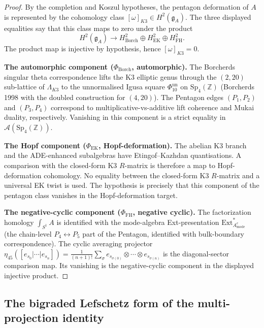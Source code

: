 \begin{proof}
By the completion and Koszul hypotheses, the pentagon deformation of
\(A\) is represented by the cohomology class
\([\omega]_{K3}\in H^2(\mathfrak g_A)\). The three displayed
equalities say that this class maps to zero under the product
\[
 H^2(\mathfrak g_A)\longrightarrow
 H^2_{\mathrm{Borch}}\oplus H^2_{\mathrm{EK}}\oplus H^2_{\mathrm{FH}} .
\]
The product map is injective by hypothesis, hence
\([\omega]_{K3}=0\).

\textbf{The automorphic component
 \textup{(}$\Phi_{\mathrm{Borch}}$, automorphic\textup{).}}
The Borcherds singular theta correspondence lifts the K$3$ elliptic
genus through the $(2, 20)$ sub-lattice of $\Lambda_{K3}$ to the unnormalised
Igusa square \(\Phi_{10}^{\mathrm{un}}\) on $\mathrm{Sp}_4(\mathbb{Z})$
\textup{(}Borcherds 1998 with the doubled construction for
$(4, 20)$\textup{).} The Pentagon edges $(P_1, P_2)$ and $(P_3, P_4)$
correspond to multiplicative-vs-additive lift coherence and Mukai
duality, respectively. Vanishing in this component is a strict equality in
$\mathcal{A}(\mathrm{Sp}_4(\mathbb{Z}))$.

\textbf{The Hopf component
 \textup{(}$\Phi_{\mathrm{EK}}$, Hopf-deformation\textup{).}}
The abelian K$3$ branch and the ADE-enhanced subalgebras have
Etingof--Kazhdan quantisations. A comparison with the closed-form
K$3$ \(R\)-matrix is therefore a map to Hopf-deformation cohomology.
No equality between the closed-form K$3$ \(R\)-matrix and a universal
EK twist is used. The hypothesis is precisely that this component of
the pentagon class vanishes in the Hopf-deformation target.

\textbf{The negative-cyclic component
 \textup{(}$\Phi_{\mathrm{FH}}$, negative cyclic\textup{).}}
The factorization homology $\int_{S^1} A$ is identified with the
mode-algebra Ext-presentation $\mathrm{Ext}^*_{A^e_{\mathrm{mode}}}$
\textup{(}the chain-level \(P_4 \leftrightarrow P_5\) part of the
Pentagon, identified with bulk-boundary correspondence\textup{).} The cyclic
averaging projector
$\eta_{45}([e_{s_0}|\cdots|e_{s_n}]) = \frac{1}{(n+1)!}\sum_{\sigma}
e_{s_{\sigma(0)}} \otimes \cdots \otimes e_{s_{\sigma(n)}}$
is the diagonal-sector comparison map. Its vanishing is the
negative-cyclic component in the displayed injective product.
\end{proof}

\subsection{The bigraded Lefschetz form of the multi-projection identity}
\label{subsec:k3-multiproj-bigraded-lefschetz}

